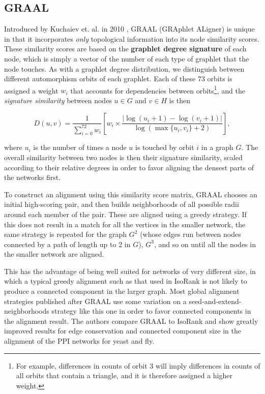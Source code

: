 \documentclass[12pt]{thesis}
\theoremstyle{plain}
\theoremstyle{definition}
\theoremstyle{remark}
\begin{document}
\subsection{GRAAL}

Introduced by Kuchaiev et. al. in 2010 \cite{Kuchaiev_2010}, GRAAL (GRAphlet ALigner) is unique in that it incorporates \textit{only} topological information into its node similarity scores. These similarity scores are based on the \textbf{graphlet degree signature} of each node, which is simply a vector of the number of each type of graphlet that the node touches. As with a graphlet degree distribution, we distinguish between different automorphism orbits of each graphlet. Each of these 73 orbits is assigned a weight $w_i$ that accounts for dependencies between orbits\footnote{For example, differences in counts of orbit 3 will imply differences in counts of all orbits that contain a triangle, and it is therefore assigned a higher weight.}, and the \textit{signature similarity} between nodes $u\in G$ and $v\in H$ is then

\[D(u,v) = \frac{1}{\sum_{i=0}^{72} w_i} \left[ w_i \times \frac{|\log(u_i + 1) - \log(v_i+1) |}{\log (\max\{u_i, v_i\} + 2)} \right], \]

where $u_i$ is the number of times a node $u$ is touched by orbit $i$ in a graph $G$. The overall similarity between two nodes is then their signature similarity, scaled according to their relative degrees in order to favor aligning the densest parts of the networks first.

To construct an alignment using this similarity score matrix, GRAAL chooses an initial high-scoring pair, and then builds neighborhoods of all possible radii around each member of the pair. These are aligned using a greedy strategy. If this does not result in a match for all the vertices in the smaller network, the same strategy is repeated for the graph $G^2$ (whose edges run between nodes connected by a path of length up to 2 in $G$), $G^3$, and so on until all the nodes in the smaller network are aligned.

This has the advantage of being well suited for networks of very different size, in which a typical greedy alignment such as that used in IsoRank is not likely to produce a connected component in the larger graph. Most global alignment strategies published after GRAAL use some variation on a seed-and-extend-neighborhoods strategy like this one in order to favor connected components in the alignment result. The authors compare GRAAL to IsoRank and show greatly improved results for edge conservation and connected component size in the alignment of the PPI networks for yeast and fly.
\end{document}
